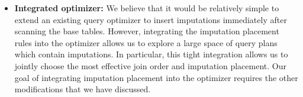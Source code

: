 {\begin{itemize}
\item \textbf{Integrated optimizer:}
  We believe that it would be relatively simple to extend an existing query optimizer to insert imputations immediately after scanning the base tables.
  However, integrating the imputation placement rules into the optimizer allows us to explore a large space of query plans which contain imputations.
  In particular, this tight integration allows us to jointly choose the most effective join order and imputation placement.
  Our goal of integrating imputation placement into the optimizer requires the other modifications that we have discussed.
\end{itemize}
}

